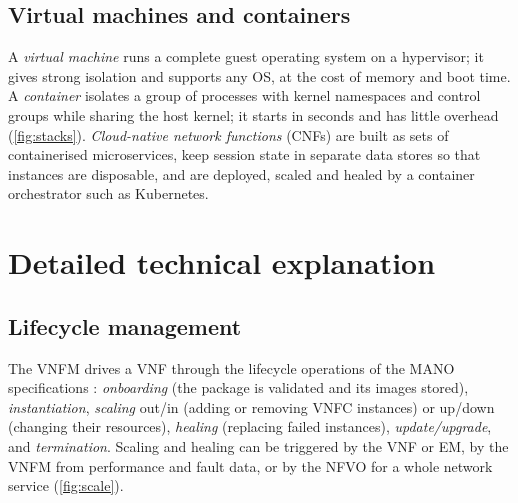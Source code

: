 \documentclass[11pt,a4paper]{article}
\begin{document}
\subsection{Virtual machines and containers}
A \emph{virtual machine} runs a complete guest operating system on a hypervisor; it gives strong isolation and
supports any OS, at the cost of memory and boot time. A \emph{container} isolates a group of processes with kernel
namespaces and control groups while sharing the host kernel; it starts in seconds and has little overhead
(\cref{fig:stacks}). \emph{Cloud-native network functions} (CNFs) are built as sets of containerised
microservices, keep session state in separate data stores so that instances are disposable, and are deployed,
scaled and healed by a container orchestrator such as Kubernetes.

\begin{acnfigure}
  \caption{From appliances to virtual machines and containers.}
  \label{fig:stacks}
\end{acnfigure}

\section{Detailed technical explanation}

\subsection{Lifecycle management}
The VNFM drives a VNF through the lifecycle operations of the MANO specifications \cite{etsinfvman001}:
\emph{onboarding} (the package is validated and its images stored), \emph{instantiation}, \emph{scaling} out/in
(adding or removing VNFC instances) or up/down (changing their resources), \emph{healing} (replacing failed
instances), \emph{update/upgrade}, and \emph{termination}. Scaling and healing can be triggered by the VNF or EM,
by the VNFM from performance and fault data, or by the NFVO for a whole network service (\cref{fig:scale}).
\end{document}
